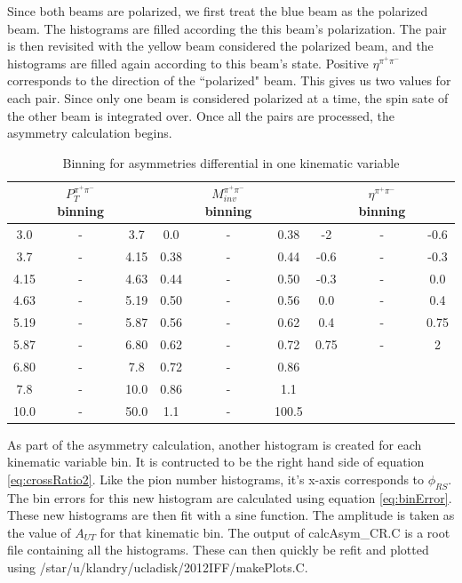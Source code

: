 \documentclass[abstract = on,listof=totoc, bibliography=totoc]{scrreprt}
\newcommand{\phirs}{\phi_{RS}}
\newcommand{\ptpair}{P_{T}^{\pi^+\pi^-}}
\newcommand{\mpair}{M_{inv}^{\pi^+\pi^-}}
\newcommand{\etapair}{\eta^{\pi^+\pi^-}}
\begin{document}
Since both beams are polarized, we first treat the blue beam as the polarized beam. The histograms are filled according the this beam's polarization. The pair is then revisited with the yellow beam considered the polarized beam, and the histograms are filled again according to this beam's state. Positive $\etapair$ corresponds to the direction of the ``polarized" beam. This gives us two values for each pair. Since only one beam is considered polarized at a time, the spin sate of the other beam is integrated over. Once all the pairs are processed, the asymmetry calculation begins. 
\begin{center}
\begin{table}[h!]
\caption{Binning for asymmetries differential in one kinematic variable}
\small
\begin{tabular}{c c c|c c c|c c c} 
\\
 & $\ptpair$ binning &  & & $\mpair$ binning & & & $\etapair$ binning &	\\ \hline
3.0 & - & 3.7	& 0.0 & - & 0.38&-2 & - & -0.6\\
3.7 & - & 4.15	&0.38 & - & 0.44&-0.6 & - & -0.3\\
4.15 & - & 4.63 &0.44 & - & 0.50	&-0.3 & - & 0.0	\\
4.63 & - & 5.19&0.50 & - & 0.56&0.0 & - & 0.4\\
5.19 & - & 5.87&0.56 & - & 0.62&0.4 & - & 0.75\\
5.87 & - & 6.80&0.62 & - & 0.72&0.75 & - &2\\
6.80 & - &7.8&0.72 & - & 0.86&\\
7.8 & - & 10.0&0.86 & - & 1.1&\\
10.0 & - & 50.0&1.1 & - & 100.5&\\
\end{tabular}
\label{tab:1dbinning}
\end{table}
\end{center}

As part of the asymmetry calculation, another histogram is created for each kinematic variable bin. It is contructed to be the right hand side of equation \ref{eq:crossRatio2}. Like the pion number histograms, it's x-axis corresponds to $\phirs$. The bin errors for this new histogram are calculated using equation \ref{eq:binError}. These new histograms are then fit with a sine function. The amplitude is taken as the value of $A_{UT}$ for that kinematic bin. The output of calcAsym\_CR.C is a root file containing all the histograms. These can then quickly be refit and plotted using /star/u/klandry/ucladisk/2012IFF/makePlots.C.
\end{document}
